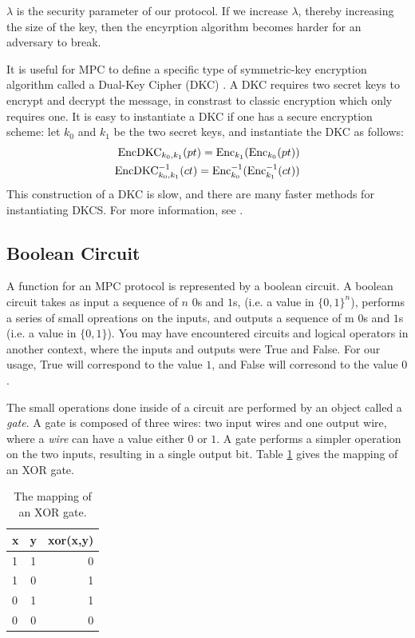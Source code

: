 $\lambda$ is the security parameter of our protocol.
If we increase $\lambda$, thereby increasing the size of the key, then the encyrption algorithm becomes harder for an adversary to break.

It is useful for MPC to define a specific type of symmetric-key encryption algorithm called a Dual-Key Cipher (DKC) \cite{bellare2012foundations}.
A DKC requires two secret keys to encrypt and decrypt the message, in constrast to classic encryption which only requires one.
It is easy to instantiate a DKC if one has a secure encryption scheme: let $k_0$ and $k_1$ be the two secret keys, and instantiate the DKC as follows:
\begin{equation}
    \begin{split}
        \operatorname{EncDKC}_{k_0, k_1}(pt) = \operatorname{Enc}_{k_1} ( \operatorname{Enc}_{k_0} ( pt )) \\
        \operatorname{EncDKC}^{-1}_{k_0, k_1}(ct) = \operatorname{Enc}^{-1}_{k_0} ( \operatorname{Enc}^{-1}_{k_1} ( ct )) 
    \end{split}
\end{equation}
This construction of a DKC is slow, and there are many faster methods for instantiating DKCS.
For more information, see \cite{bellare2012foundations}.

\subsection{Boolean Circuit} 
A function for an MPC protocol is represented by a boolean circuit.
A boolean circuit takes as input a sequence of $n$ $0$s and $1$s, (i.e. a value in $\{0,1\}^n$), performs a series of small opreations on the inputs, and outputs a sequence of m $0$s and $1$s (i.e. a value in $\{0,1\}$).
You may have encountered circuits and logical operators in another context, where the inputs and outputs were True and False.
For our usage, True will correspond to the value $1$, and False will corresond to the value $0$. 

The small operations done inside of a circuit are performed by an object called a \emph{gate}.
A gate is composed of three wires: two input wires and one output wire, where a \emph{wire} can have a value either $0$ or $1$.
A gate performs a simpler operation on the two inputs, resulting in a single output bit.
Table \ref{tab:xor} gives the mapping of an XOR gate.

\begin{table}[h]
\label{tab:xor}
\centering
\begin{tabular}{ | l | c || r |}
\hline
x & y & xor(x,y) \\ \hline
1 & 1 & 0 \\ \hline
1 & 0 & 1 \\ \hline
0 & 1 & 1 \\ \hline
0 & 0 & 0 \\ \hline
\end{tabular}
\caption{The mapping of an XOR gate.}
\end{table}

